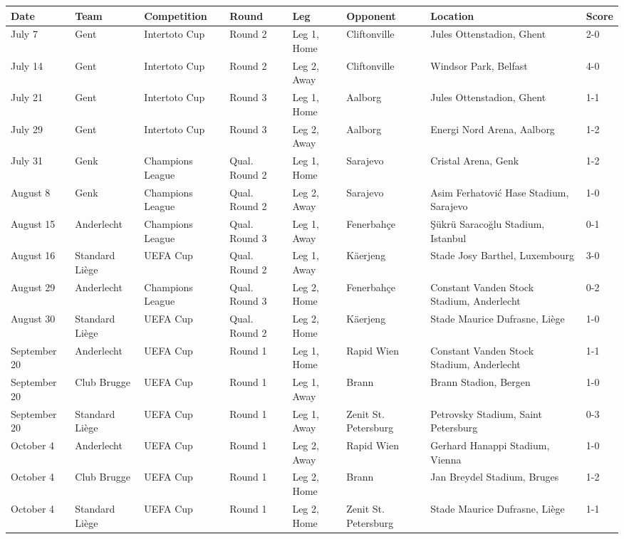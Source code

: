 \documentclass{article}
\begin{document}
\begin{tabular}{llllllll}
\toprule
Date & Team & Competition & Round & Leg & Opponent & Location & Score \\
\midrule
July 7 & Gent & Intertoto Cup & Round 2 & Leg 1, Home & Cliftonville & Jules Ottenstadion, Ghent & 2-0 \\
July 14 & Gent & Intertoto Cup & Round 2 & Leg 2, Away & Cliftonville & Windsor Park, Belfast & 4-0 \\
July 21 & Gent & Intertoto Cup & Round 3 & Leg 1, Home & Aalborg & Jules Ottenstadion, Ghent & 1-1 \\
July 29 & Gent & Intertoto Cup & Round 3 & Leg 2, Away & Aalborg & Energi Nord Arena, Aalborg & 1-2 \\
July 31 & Genk & Champions League & Qual. Round 2 & Leg 1, Home & Sarajevo & Cristal Arena, Genk & 1-2 \\
August 8 & Genk & Champions League & Qual. Round 2 & Leg 2, Away & Sarajevo & Asim Ferhatović Hase Stadium, Sarajevo & 1-0 \\
August 15 & Anderlecht & Champions League & Qual. Round 3 & Leg 1, Away & Fenerbahçe & Şükrü Saracoğlu Stadium, Istanbul & 0-1 \\
August 16 & Standard Liège & UEFA Cup & Qual. Round 2 & Leg 1, Away & Käerjeng & Stade Josy Barthel, Luxembourg & 3-0 \\
August 29 & Anderlecht & Champions League & Qual. Round 3 & Leg 2, Home & Fenerbahçe & Constant Vanden Stock Stadium, Anderlecht & 0-2 \\
August 30 & Standard Liège & UEFA Cup & Qual. Round 2 & Leg 2, Home & Käerjeng & Stade Maurice Dufrasne, Liège & 1-0 \\
September 20 & Anderlecht & UEFA Cup & Round 1 & Leg 1, Home & Rapid Wien & Constant Vanden Stock Stadium, Anderlecht & 1-1 \\
September 20 & Club Brugge & UEFA Cup & Round 1 & Leg 1, Away & Brann & Brann Stadion, Bergen & 1-0 \\
September 20 & Standard Liège & UEFA Cup & Round 1 & Leg 1, Away & Zenit St. Petersburg & Petrovsky Stadium, Saint Petersburg & 0-3 \\
October 4 & Anderlecht & UEFA Cup & Round 1 & Leg 2, Away & Rapid Wien & Gerhard Hanappi Stadium, Vienna & 1-0 \\
October 4 & Club Brugge & UEFA Cup & Round 1 & Leg 2, Home & Brann & Jan Breydel Stadium, Bruges & 1-2 \\
October 4 & Standard Liège & UEFA Cup & Round 1 & Leg 2, Home & Zenit St. Petersburg & Stade Maurice Dufrasne, Liège & 1-1 \\

\end{tabular}
\end{document}
